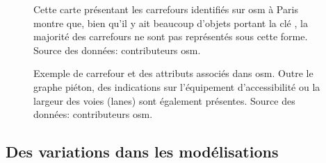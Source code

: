 \begin{figure}[ht]
    \centering
    \caption[Les carrefours dans OpenStreetMap à Paris]{Cette carte présentant les carrefours identifiés sur \gls{osm} à Paris montre que, bien qu'il y ait beaucoup d'objets portant la clé , la majorité des carrefours ne sont pas représentés sous cette forme. Source des données: contributeurs \gls{osm}.}
    \label{fig:modelisation_carrefours_osm_paris}
\end{figure}

\begin{figure}[ht]
    \centering
    \caption[Anatomie d'un carrefour dans OpenStreetMap]{Exemple de carrefour et des attributs associés dans \gls{osm}. Outre le graphe piéton, des indications sur l'équipement d'accessibilité ou la largeur des voies (lanes) sont également présentes. Source des données: contributeurs \gls{osm}.}
    \label{fig:modelisation_anatomie_carrefour_osm}
\end{figure}

\subsection{Des variations dans les modélisations}


